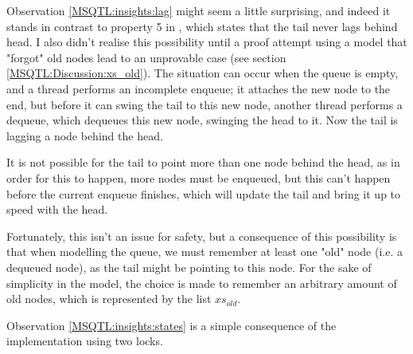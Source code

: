 \documentclass[twoside,11pt,openright]{report}
\begin{document}
Observation \ref{MSQTL:insights:lag} might seem a little surprising, and indeed it stands in contrast to property 5 in \cite{DBLP:conf/podc/MichaelS96}, which states that the tail never lags behind head. I also didn't realise this possibility until a proof attempt using a model that "forgot" old nodes lead to an unprovable case (see section \ref{MSQTL:Discussion:xs_old}). The situation can occur when the queue is empty, and a thread performs an incomplete enqueue; it attaches the new node to the end, but before it can swing the tail to this new node, another thread performs a dequeue, which dequeues this new node, swinging the head to it. Now the tail is lagging a node behind the head.

It is not possible for the tail to point more than one node behind the head, as in order for this to happen, more nodes must be enqueued, but this can't happen before the current enqueue finishes, which will update the tail and bring it up to speed with the head.

Fortunately, this isn't an issue for safety, but a consequence of this possibility is that when modelling the queue, we must remember at least one "old" node (i.e. a dequeued node), as the tail might be pointing to this node. For the sake of simplicity in the model, the choice is made to remember an arbitrary amount of old nodes, which is represented by the list $xs_{old}$.

Observation \ref{MSQTL:insights:states} is a simple consequence of the implementation using two locks.
\end{document}

